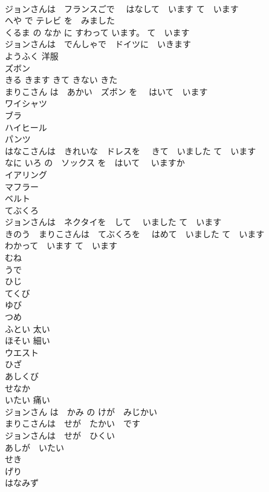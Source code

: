 \documentclass[8pt]{extreport}
\begin{document}
\begin{CJK}{UTF8}{min}
\\	ジョンさんは　フランスごで　 はなして　います	て　います 
\\	へや で テレビ を　みました	
\\	くるま の なか に すわって います。	て　います 
\\	ジョンさんは　でんしゃで　ドイツに　いきます	
\\	ようふく	洋服
\\	ズボン	
\\	きる	きます	きて	きない	きた	
\\	まりこさん は　あかい　ズボン を　 はいて　います	
\\	ワイシャツ	
\\	ブラ	
\\	ハイヒール	
\\	パンツ	
\\	はなこさんは　きれいな　ドレスを　 きて　いました	て　います 
\\	なに いろ の　ソックス を　はいて　 いますか	
\\	イアリング	
\\	マフラー	
\\	ベルト	
\\	てぶくろ	
\\	ジョンさんは　ネクタイを　して　 いました	て　います 
\\	きのう　まりこさんは　てぶくろを　 はめて　いました	て　います 
\\	わかって　います	て　います 
\\	むね	
\\	うで	
\\	ひじ	
\\	てくび	
\\	ゆび	
\\	つめ	
\\	ふとい	太い
\\	ほそい	細い
\\	ウエスト	
\\	ひざ	
\\	あしくび	
\\	せなか	
\\	いたい	痛い
\\	ジョンさん は　かみ の けが　みじかい	
\\	まりこさんは　せが　たかい　です	
\\	ジョンさんは　せが　ひくい	
\\	あしが　いたい	
\\	せき	
\\	げり	
\\	はなみず	

\end{CJK}
\end{document}

